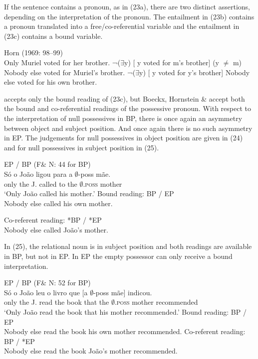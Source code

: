 \documentclass[output=paper]{langsci/langscibook}
\begin{document}
If the sentence contains a pronoun, as in (23a), there are two distinct assertions, depending on the interpretation of the pronoun. The entailment in (23b) contains a pronoun translated into a free/co-referential variable and the entailment in (23c) contains a bound variable.

\ea%
    Horn (1969: 98–99)
    \label{ex:wein:23}\\
    \ea Only Muriel voted for her brother.
    \ex  ¬(${\exists}$y) [ y voted for m’s brother] (y ${\neq}$ m)  
    \glt Nobody else voted for Muriel’s brother.
    \ex ¬(${\exists}$y) [ y voted for y’s brother]
    \glt Nobody else voted for his own brother.
    \z
\z

\citet[102]{Horn1969} accepts only the bound reading of (23c), but Boeckx, Hornstein \& \citet[197]{Nunes2010} accept both the bound and co-referential readings of the possessive pronoun. With respect to the interpretation of null possessives in BP, there is once again an asymmetry between object and subject position. And once again there is no such asymmetry in EP. The judgements for null possessives in object position are given in (24) and for null possessives in subject position in (25).

\ea%
    EP / BP (F\& N: 44 for BP)\label{ex:wein:24}\\
    \ea 
    \gll Só o João ligou para a $\emptyset$-poss mãe.\\
         only the J. called to the $\emptyset$\textsc{.poss} mother\\
    \glt ‘Only João called his mother.’
    \ex Bound reading: BP / EP\\Nobody else called his own mother.
    
    \ex Co-referent reading: *BP / *EP\\Nobody else called João’s mother.
    \z
\z

In (25), the relational noun is in subject position and both readings are available in BP, but not in EP. In EP the empty possessor can only receive a bound interpretation.

\ea%
    EP / BP (F\& N: 52 for BP)\label{ex:wein:25}\\
    \ea 
    \gll Só o João leu o livro que [a $\emptyset$-poss mãe] indicou.\\
         only the J. read the book that the $\emptyset$\textsc{.poss} mother recommended\\
    \glt ‘Only João read the book that his mother recommended.’
    \ex Bound reading: BP / EP\\Nobody else read the book his own mother recommended.
    \ex Co-referent reading: BP / *EP\\Nobody else read the book João’s mother recommended.
    \z
\z
\end{document}
